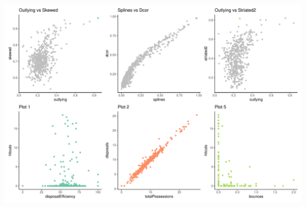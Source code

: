 \begin{Schunk}


\begin{center}\includegraphics[width=0.7\linewidth]{mason-lee-laa-cook_files/figure-latex/threeplot-static-1} \end{center}

\end{Schunk}

